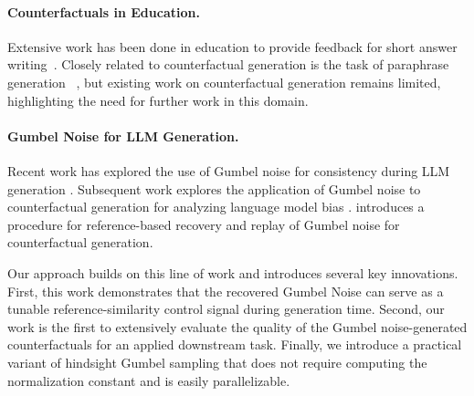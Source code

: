 \documentclass[letterpaper]{article} %
\newcommand{\mh}[1]{\textcolor{teal}{\bf [Hunter: #1]}}
\begin{document}
\paragraph{Counterfactuals in Education.} Extensive work has been done in education to provide feedback for short answer writing~\cite{filighera_your_2022, mcnichols_can_2024, scarlatos_improving_2024}. Closely related to counterfactual generation is the task of paraphrase generation ~\cite{ouahrani_paraphrase_2024}, but existing work on counterfactual generation remains limited, highlighting the need for further work in this domain.  




\paragraph{Gumbel Noise for LLM Generation.} Recent work has explored the use of Gumbel noise for consistency during LLM generation \cite{de_mijolla_waste_2025}. Subsequent work explores the application of Gumbel noise to counterfactual generation for analyzing language model bias \cite{chatzi2025counterfactual}. \citet{ravfogel2025gumbel} introduces a procedure for reference-based recovery and replay of Gumbel noise for counterfactual generation. 

Our approach builds on this line of work and introduces several key innovations. First, this work demonstrates that the recovered Gumbel Noise can serve as a tunable reference-similarity control signal during generation time. Second, our work is the first to extensively evaluate the quality of the Gumbel noise-generated counterfactuals for an applied downstream task. Finally, we introduce a practical variant of hindsight Gumbel sampling that does not require computing the normalization constant and is easily parallelizable. 


\end{document}
